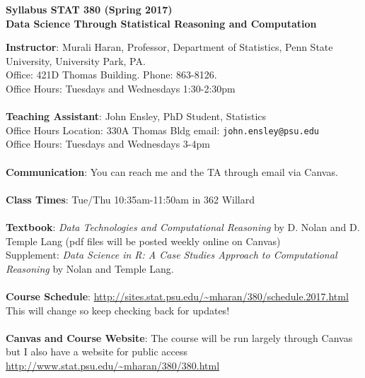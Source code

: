 \documentclass[10pt]{article}
\begin{document}
\pagestyle{empty}
\Large
\begin{center}
{\bf  Syllabus STAT 380 (Spring 2017)}\\
{\bf Data Science Through Statistical Reasoning and Computation}\\
\end{center}
\normalsize {\bf Instructor}: Murali Haran, Professor, Department of Statistics, Penn State University,
University Park, PA. \\ Office: 421D Thomas
Building. \:Phone: 863-8126. \\ Office
Hours: Tuesdays and Wednesdays 1:30-2:30pm\\\\
{\bf Teaching Assistant}: John Ensley, PhD Student, Statistics \\
Office Hours Location: 330A Thomas Bldg \:email: {\tt john.ensley@psu.edu}\\
Office Hours: Tuesdays and Wednesdays 3-4pm  \\\\ %
{\bf Communication}: You can reach me and the TA through email via Canvas.\\\\ %
{\bf Class Times}: Tue/Thu 10:35am-11:50am in 362 Willard\\\\
{\bf Textbook}: {\it Data Technologies and Computational Reasoning} by D. Nolan and D. Temple Lang (pdf files will be posted weekly online on Canvas)\\
Supplement: {\it Data Science in R: A Case Studies Approach to Computational Reasoning} by Nolan and Temple Lang.\\\\
{\bf Course Schedule}: \url{http://sites.stat.psu.edu/~mharan/380/schedule.2017.html} This will change so keep checking back for updates!\\\\
{\bf Canvas and Course Website}: The course will be run largely through Canvas but I also have a website for public access \url{http://www.stat.psu.edu/~mharan/380/380.html}\\\\
\end{document}

